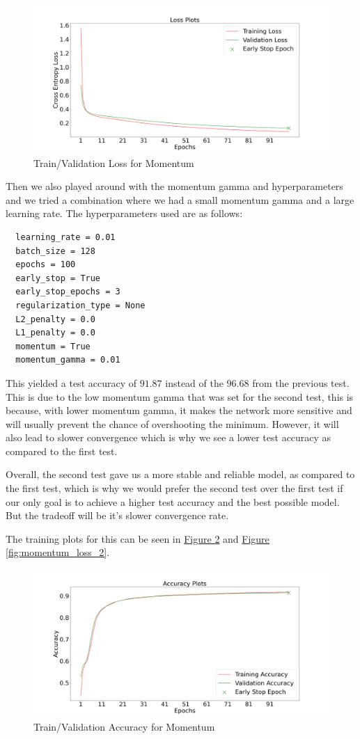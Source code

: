 \documentclass{article}
\begin{document}
\begin{figure}[h]
  \centering
  \includegraphics[width=0.8\linewidth]{include/momentum-experiments-loss.png}
  \caption{Train/Validation Loss for Momentum}
  \label{fig:momentum_loss}
\end{figure}

Then we also played around with the momentum gamma and hyperparameters
and we tried a combination where we had a small momentum gamma and a
large learning rate. The hyperparameters used are as follows:
\begin{verbatim}
  learning_rate = 0.01
  batch_size = 128
  epochs = 100
  early_stop = True
  early_stop_epochs = 3
  regularization_type = None
  L2_penalty = 0.0
  L1_penalty = 0.0
  momentum = True
  momentum_gamma = 0.01
\end{verbatim}

This yielded a test accuracy of $91.87$ instead of the $96.68$ from the previous test. This is due to the low momentum gamma that was set for the second test, this is because, with lower
momentum gamma, it makes the network more sensitive and will usually prevent the chance of overshooting the minimum. However, 
it will also lead to slower convergence which is why we see a lower test accuracy as compared to the first test.

Overall, the second test gave us a more stable and reliable model, as compared to the first test, which is why we would prefer the second test over the first test if our only goal is 
to achieve a higher test accuracy and the best possible 
model. But the tradeoff will be it's slower convergence rate.

The training plots for this can be seen in 
\hyperref[fig:momentum_acc_2]{Figure \ref{fig:momentum_acc_2}} and
\hyperref[fig:momentum_loss_2]{Figure \ref{fig:momentum_loss_2}}.

\begin{figure}[h]
  \centering
  \includegraphics[width=0.8\linewidth]{include/momentum-experiments-acc-2.png}
  \caption{Train/Validation Accuracy for Momentum}
  \label{fig:momentum_acc_2}
\end{figure}
\end{document}
